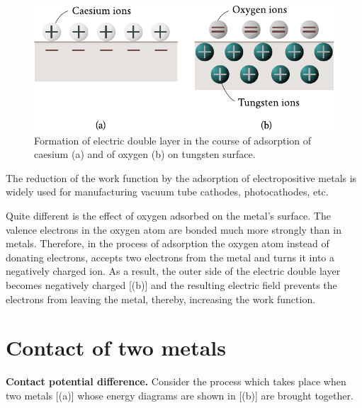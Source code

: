 \begin{figure}[h]
	\begin{center}
		\includegraphics[scale=0.95]{figures/ch_08/fig_8_3.pdf}
		\caption[]{Formation of electric double layer in the course of adsorption of caesium (a) and of oxygen (b) on tungsten surface.}
		\label{fig:8_3}
	\end{center}
	\vspace{-0.8cm}
\end{figure}

The reduction of the work function by the adsorption of electropositive metals is widely used for manufacturing vacuum tube cathodes, photocathodes, etc.

Quite different is the effect of oxygen adsorbed on the metal's surface. The valence electrons in the oxygen atom are bonded much more strongly than in metals. Therefore, in the process of adsorption
the oxygen atom instead of donating electrons, accepts two electrons from the metal and turns it into a negatively charged ion. As a result, the outer side of the electric double layer becomes negatively
charged [(b)] and the resulting electric field prevents the electrons from leaving the metal, thereby, increasing the work function.

\section{Contact of two metals}\label{sec:74}

\textbf{Contact potential difference.} Consider the process which takes place when two metals [(a)] whose energy diagrams are shown in [(b)] are brought together.


